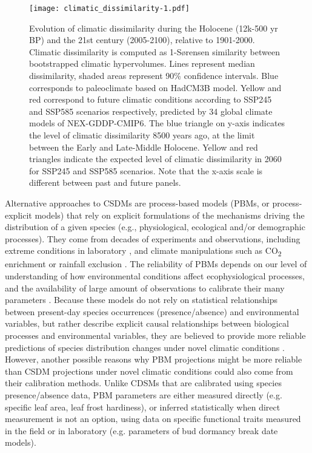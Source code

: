 \documentclass[9pt,twocolumn,twoside]{pnas-new}
\begin{document}
\begin{figure}%
\centering
\texttt{[image: climatic\_dissimilarity-1.pdf]}
\caption{Evolution of climatic dissimilarity during the Holocene (12k-500 yr BP) and the 21st century (2005-2100), relative to 1901-2000. Climatic dissimilarity is computed as 1-Sørensen similarity between bootstrapped climatic hypervolumes. Lines represent median dissimilarity, shaded areas represent 90\% confidence intervals. Blue corresponds to paleoclimate based on HadCM3B model. Yellow and red correspond to future climatic conditions according to SSP245 and SSP585 scenarios respectively, predicted by 34 global climate models of NEX-GDDP-CMIP6. The blue triangle on y-axis indicates the level of climatic dissimilarity 8500 years ago, at the limit between the Early and Late-Middle Holocene. Yellow and red triangles indicate the expected level of climatic dissimilarity in 2060 for SSP245 and SSP585 scenarios. Note that the x-axis scale is different between past and future panels.}
\label{fig:climaticdissimilarity}
\end{figure}

Alternative approaches to CSDMs are process-based models (PBMs, or process-explicit models) that rely on explicit formulations of the mechanisms driving the distribution of a given species (e.g., physiological, ecological and/or demographic processes). They come from decades of experiments and observations, including extreme conditions in laboratory \cite{Seehausen2017}, and climate manipulations such as CO\textsubscript{2} enrichment \cite{Jiang2020} or rainfall exclusion \cite{Gavinet2019}. The reliability of PBMs depends on our level of understanding of how environmental conditions affect ecophysiological processes, and the availability of large amount of observations to calibrate their many parameters \cite{Evans2016}. Because these models do not rely on statistical relationships between present-day species occurrences (presence/absence) and environmental variables, but rather describe explicit causal relationships between biological processes and environmental variables, they are believed to provide more reliable predictions of species distribution changes under novel climatic conditions  \cite{Evans2012, Singer2016}. However, another possible reasons why PBM projections might be more reliable than CSDM projections under novel climatic conditions could also come from their calibration methods. Unlike CDSMs that are calibrated using species presence/absence data, PBM parameters are either measured directly (e.g. specific leaf area, leaf frost hardiness), or inferred statistically when direct measurement is not an option, using data on specific functional traits measured in the field or in laboratory (e.g. parameters of bud dormancy break date models). 
\end{document}
